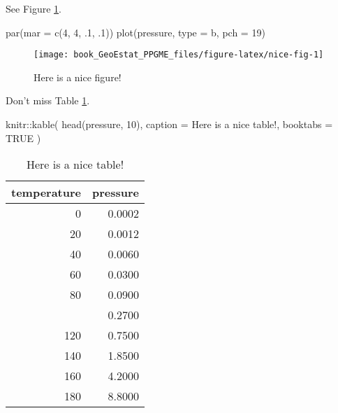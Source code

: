 \documentclass[
]{book}
\newenvironment{Shaded}{\begin{snugshade}}{\end{snugshade}}
\newcommand{\AttributeTok}[1]{\textcolor[rgb]{0.77,0.63,0.00}{#1}}
\newcommand{\ConstantTok}[1]{\textcolor[rgb]{0.00,0.00,0.00}{#1}}
\newcommand{\DecValTok}[1]{\textcolor[rgb]{0.00,0.00,0.81}{#1}}
\newcommand{\FunctionTok}[1]{\textcolor[rgb]{0.00,0.00,0.00}{#1}}
\newcommand{\NormalTok}[1]{#1}
\newcommand{\SpecialCharTok}[1]{\textcolor[rgb]{0.00,0.00,0.00}{#1}}
\newcommand{\StringTok}[1]{\textcolor[rgb]{0.31,0.60,0.02}{#1}}
\theoremstyle{definition}
\theoremstyle{definition}
\theoremstyle{definition}
\theoremstyle{definition}
\theoremstyle{remark}
\begin{document}
See Figure \ref{fig:nice-fig}.

\begin{Shaded}
\begin{Highlighting}[]
\FunctionTok{par}\NormalTok{(}\AttributeTok{mar =} \FunctionTok{c}\NormalTok{(}\DecValTok{4}\NormalTok{, }\DecValTok{4}\NormalTok{, .}\DecValTok{1}\NormalTok{, .}\DecValTok{1}\NormalTok{))}
\FunctionTok{plot}\NormalTok{(pressure, }\AttributeTok{type =} \StringTok{\textquotesingle{}b\textquotesingle{}}\NormalTok{, }\AttributeTok{pch =} \DecValTok{19}\NormalTok{)}
\end{Highlighting}
\end{Shaded}

\begin{figure}

{\centering \texttt{[image: book\_GeoEstat\_PPGME\_files/figure-latex/nice-fig-1]} 

}

\caption{Here is a nice figure!}\label{fig:nice-fig}
\end{figure}

Don't miss Table \ref{tab:nice-tab}.

\begin{Shaded}
\begin{Highlighting}[]
\NormalTok{knitr}\SpecialCharTok{::}\FunctionTok{kable}\NormalTok{(}
  \FunctionTok{head}\NormalTok{(pressure, }\DecValTok{10}\NormalTok{), }\AttributeTok{caption =} \StringTok{\textquotesingle{}Here is a nice table!\textquotesingle{}}\NormalTok{,}
  \AttributeTok{booktabs =} \ConstantTok{TRUE}
\NormalTok{)}
\end{Highlighting}
\end{Shaded}

\begin{table}

\caption{\label{tab:nice-tab}Here is a nice table!}
\centering
\begin{tabular}[t]{rr}
\toprule
temperature & pressure\\
\midrule
0 & 0.0002\\
20 & 0.0012\\
40 & 0.0060\\
60 & 0.0300\\
80 & 0.0900\\
\addlinespace
100 & 0.2700\\
120 & 0.7500\\
140 & 1.8500\\
160 & 4.2000\\
180 & 8.8000\\
\bottomrule
\end{tabular}
\end{table}
\end{document}
